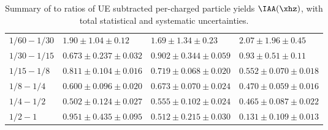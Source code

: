 \begin{table}[!ht]
\begin{center}
\begin{tabular}{|l|l|l|l|}
\footnotesize {$1/60 - 1/30$} & \footnotesize {$1.90 \pm 1.04 \pm 0.12$}  & \footnotesize {$1.69 \pm 1.34 \pm 0.23$}  & \footnotesize {$2.07 \pm 1.96 \pm 0.45$}  \\
\footnotesize {$1/30 - 1/15$} & \footnotesize {$0.673 \pm 0.237 \pm 0.032$}  & \footnotesize {$0.902 \pm 0.344 \pm 0.059$}  & \footnotesize {$0.93 \pm 0.51 \pm 0.11$}  \\
\footnotesize {$1/15 - 1/8$} & \footnotesize {$0.811 \pm 0.104 \pm 0.016$}  & \footnotesize {$0.719 \pm 0.068 \pm 0.020$}  & \footnotesize {$0.552 \pm 0.070 \pm 0.018$}  \\
\footnotesize {$1/8 - 1/4$} & \footnotesize {$0.600 \pm 0.096 \pm 0.020$}  & \footnotesize {$0.673 \pm 0.070 \pm 0.024$}  & \footnotesize {$0.470 \pm 0.059 \pm 0.016$}  \\
\footnotesize {$1/4 - 1/2$} & \footnotesize {$0.502 \pm 0.124 \pm 0.027$}  & \footnotesize {$0.555 \pm 0.102 \pm 0.024$}  & \footnotesize {$0.465 \pm 0.087 \pm 0.022$}  \\
\footnotesize {$1/2 - 1$} & \footnotesize {$0.951 \pm 0.435 \pm 0.095$}  & \footnotesize {$0.512 \pm 0.215 \pm 0.030$}  & \footnotesize {$0.131 \pm 0.109 \pm 0.013$}  \\
\hline
\end{tabular}
\caption{Summary of \PbPb to \pp ratios of UE subtracted per-\Zboson charged particle yields $\IAA (\xhz)$, with total statistical and systematic uncertainties.}
\label{tab4}
\end{center}
\end{table}
